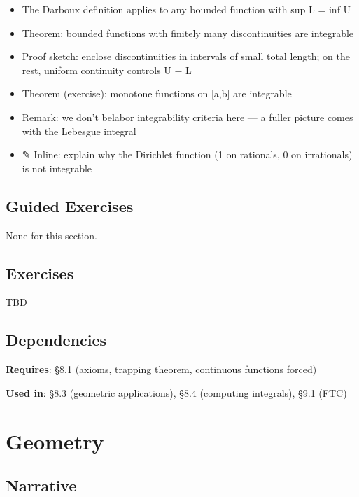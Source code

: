 \documentclass[
  10pt,
  letterpaper,
]{scrbook}
\providecommand{\tightlist}{%
  \setlength{\itemsep}{0pt}\setlength{\parskip}{0pt}}
\begin{document}
\begin{itemize}
\tightlist
\item
  The Darboux definition applies to any bounded function with sup L =
  inf U
\item
  Theorem: bounded functions with finitely many discontinuities are
  integrable
\item
  Proof sketch: enclose discontinuities in intervals of small total
  length; on the rest, uniform continuity controls U − L
\item
  Theorem (exercise): monotone functions on {[}a,b{]} are integrable
\item
  Remark: we don't belabor integrability criteria here --- a fuller
  picture comes with the Lebesgue integral
\item
  ✎ Inline: explain why the Dirichlet function (1 on rationals, 0 on
  irrationals) is not integrable
\end{itemize}

\subsection{Guided Exercises}\label{guided-exercises-16}

None for this section.

\subsection{Exercises}\label{exercises-35}

TBD

\subsection{Dependencies}\label{dependencies-35}

\textbf{Requires}: §8.1 (axioms, trapping theorem, continuous functions
forced)

\textbf{Used in}: §8.3 (geometric applications), §8.4 (computing
integrals), §9.1 (FTC)

\section{Geometry}\label{geometry}

\subsection{Narrative}\label{narrative-36}
\end{document}
